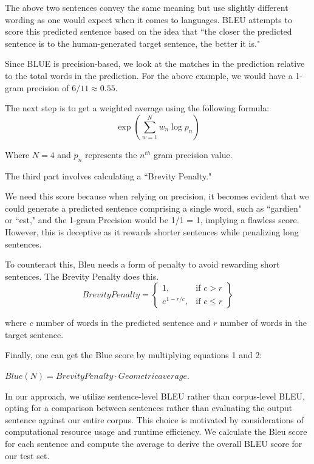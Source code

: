 \documentclass{article}
\begin{document}
The above two sentences convey the same meaning but use slightly 
different wording as one would expect when it comes to languages. BLEU attempts to score this predicted sentence
based on the idea that ``the closer the predicted sentence is to the human-generated target sentence, the better it is."\cite{Doshi}

Since BLUE is precision-based, we look at the matches in the prediction relative to the total words in the prediction. For the above example, 
we would have a 1-gram precision of $6/11 \approx 0.55$. 

The next step is to get a weighted average using the following formula:
\begin{equation}
\exp\left(\sum_{w=1}^{N} w_n \log p_n\right)
\end{equation}

Where $N=4$ and $p_n$ represents the $n^{th}$ gram precision value. 

The third part involves calculating a ``Brevity Penalty."

We need this score because when relying on precision, it becomes evident that we could generate a predicted sentence comprising a single word, such as ``gardien" or ``est," and the 1-gram Precision would be 1/1 = 1, implying a flawless score. However, this is deceptive as it rewards shorter sentences while penalizing long sentences. 

To counteract this, Bleu needs a form of penalty to avoid rewarding short sentences. The Brevity Penalty does this.
\begin{equation}
Brevity Penalty = 
\left\{
    \begin{array}{lr}
        1, & \text{if } c > r\\
        e^{1-r/c}, & \text{if } c\leq r
    \end{array}
\right\} 
\end{equation}

where $c$ number of words in the predicted 
sentence and $r$ number of words in the target 
sentence.


Finally, one can get the Blue score  by multiplying equations 1 and 2:

$Blue(N) = Brevity Penalty \cdot Geometric average. $



In our approach, we utilize sentence-level BLEU rather than 
corpus-level BLEU, opting for a comparison between sentences 
rather than evaluating the output sentence against our entire
corpus. This choice is motivated by considerations of computational resource usage and runtime efficiency. We calculate the Bleu score for each sentence and compute the average to derive the overall BLEU score for our test set.
\end{document}
